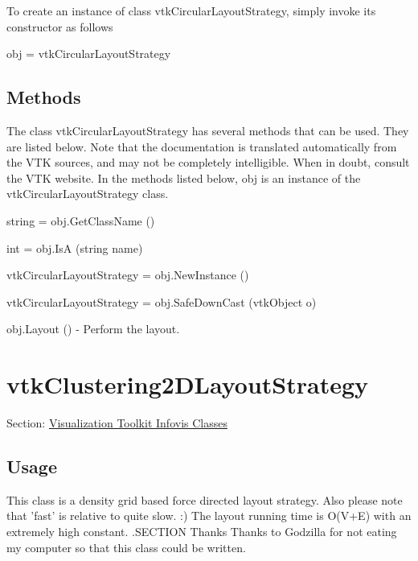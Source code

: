To create an instance of class vtk\-Circular\-Layout\-Strategy, simply invoke its constructor as follows \begin{DoxyVerb}  obj = vtkCircularLayoutStrategy
\end{DoxyVerb}
 \hypertarget{vtkwidgets_vtkxyplotwidget_Methods}{}\subsection{Methods}\label{vtkwidgets_vtkxyplotwidget_Methods}
The class vtk\-Circular\-Layout\-Strategy has several methods that can be used. They are listed below. Note that the documentation is translated automatically from the V\-T\-K sources, and may not be completely intelligible. When in doubt, consult the V\-T\-K website. In the methods listed below, {\ttfamily obj} is an instance of the vtk\-Circular\-Layout\-Strategy class. 
\begin{DoxyItemize}
\item {\ttfamily string = obj.\-Get\-Class\-Name ()}  
\item {\ttfamily int = obj.\-Is\-A (string name)}  
\item {\ttfamily vtk\-Circular\-Layout\-Strategy = obj.\-New\-Instance ()}  
\item {\ttfamily vtk\-Circular\-Layout\-Strategy = obj.\-Safe\-Down\-Cast (vtk\-Object o)}  
\item {\ttfamily obj.\-Layout ()} -\/ Perform the layout.  
\end{DoxyItemize}\hypertarget{vtkinfovis_vtkclustering2dlayoutstrategy}{}\section{vtk\-Clustering2\-D\-Layout\-Strategy}\label{vtkinfovis_vtkclustering2dlayoutstrategy}
Section\-: \hyperlink{sec_vtkinfovis}{Visualization Toolkit Infovis Classes} \hypertarget{vtkwidgets_vtkxyplotwidget_Usage}{}\subsection{Usage}\label{vtkwidgets_vtkxyplotwidget_Usage}
This class is a density grid based force directed layout strategy. Also please note that 'fast' is relative to quite slow. \-:) The layout running time is O(V+\-E) with an extremely high constant. .S\-E\-C\-T\-I\-O\-N Thanks Thanks to Godzilla for not eating my computer so that this class could be written.


